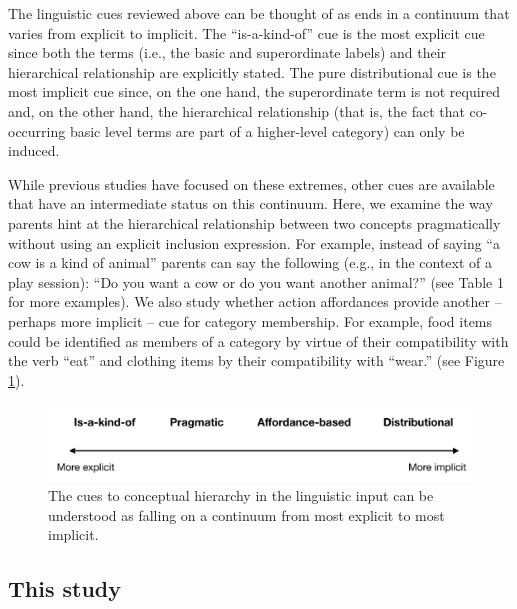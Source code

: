 \documentclass[english,,man,floatsintext]{apa6}
\begin{document}
The linguistic cues reviewed above can be thought of as ends in a continuum that varies from explicit to implicit. The \enquote{is-a-kind-of} cue is the most explicit cue since both the terms (i.e., the basic and superordinate labels) and their hierarchical relationship are explicitly stated. The pure distributional cue is the most implicit cue since, on the one hand, the superordinate term is not required and, on the other hand, the hierarchical relationship (that is, the fact that co-occurring basic level terms are part of a higher-level category) can only be induced.

While previous studies have focused on these extremes, other cues are available that have an intermediate status on this continuum. Here, we examine the way parents hint at the hierarchical relationship between two concepts pragmatically without using an explicit inclusion expression. For example, instead of saying \enquote{a cow is a kind of animal} parents can say the following (e.g., in the context of a play session): \enquote{Do you want a cow or do you want another animal?} (see Table 1 for more examples). We also study whether action affordances provide another -- perhaps more implicit -- cue for category membership. For example, food items could be identified as members of a category by virtue of their compatibility with the verb \enquote{eat} and clothing items by their compatibility with \enquote{wear.} (see Figure \ref{fig:cues}).

\begin{figure}[h]

{\centering \includegraphics{cogsci_journal_files/figure-latex/cues-1} 

}

\caption{\label{fig:cues} The cues to conceptual hierarchy in the linguistic input can be understood as falling on a continuum from most explicit to most implicit.}\label{fig:cues}
\end{figure}

\hypertarget{this-study}{%
\subsection{This study}\label{this-study}}
\end{document}
